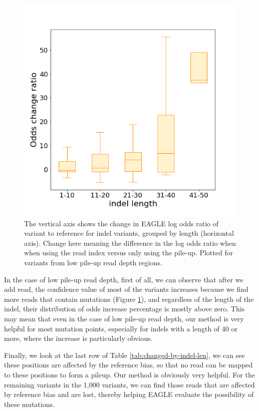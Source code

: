 \vspace{1cm}
\begin{figure}[H]
    \centering
    \includegraphics[width=0.6\columnwidth]{body/image/4-5.png}
    \captionsetup{labelfont=bf}
    \renewcommand{\baselinestretch}{1.0}
    \caption[low pile-up read depth odds change ratio]{The vertical axis shows the change in EAGLE log odds ratio of variant to reference for indel variants, grouped by length (horizontal axis).  Change here meaning the difference in the log odds ratio when when using the read index versus only using the pile-up.  Plotted for variants from low pile-up read depth regions.}
    \label{f4-5}
\end{figure}

In the case of low pile-up read depth, first of all, we can observe that after we add read, the confidence value of most of the variants increases because we find more reads that contain mutations (Figure \ref{f4-5}), and regardless of the length of the indel, their distribution of odds increase percentage is mostly above zero.
This may mean that even in the case of low pile-up read depth, our method is very helpful for most mutation points, especially for indels with a length of 40 or more, where the increase is particularly obvious.

Finally, we look at the last row of Table \ref{tab:changed-by-indel-len}, we can see these positions are affected by the reference bias, so that no read can be mapped to these positions to form a pileup. Our method is obviously very helpful. For the remaining variants in the 1,000 variants, we can find those reads that are affected by reference bias and are lost, thereby helping EAGLE evaluate the possibility of these mutations.


